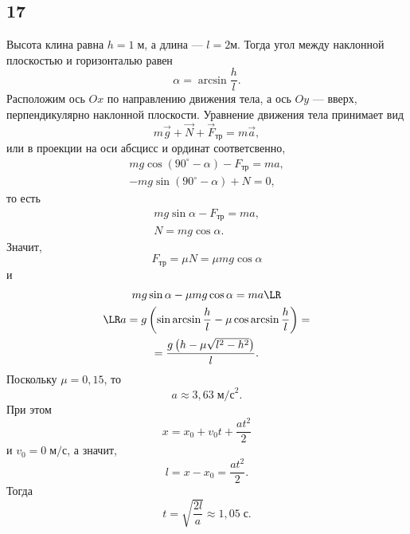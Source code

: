\subsection{17}

Высота клина равна $h=1\;\text{м}$, а длина --- $l=2\text{м}$. Тогда угол между наклонной плоскостью и горизонталью равен
\[
\alpha=\arcsin\frac{h}{l}.
\]
Расположим ось $Ox$ по направлению движения тела, а ось $Oy$ --- вверх, перпендикулярно наклонной плоскости. Уравнение движения тела принимает вид
\[
m\vec g+\vec N +\vec F_\text{тр}=m\vec a,
\]
или в проекции на оси абсцисс и ординат соответсвенно,
\begin{gather*}
mg\cos(90^\circ-\alpha)-F_\text{тр}=ma, \\
-mg\sin(90^\circ-\alpha)+N=0,
\end{gather*}
то есть
\begin{gather*}
mg\sin\alpha-F_\text{тр}=ma, \\
N=mg\cos\alpha.
\end{gather*}
Значит,
\[
F_\text{тр}=\mu N=\mu mg\cos\alpha
\]
и
\begin{multline*}
mg\sin\alpha-\mu mg\cos\alpha=ma\LR \\
\LR a=g\left(\sin\arcsin\frac{h}{l}-\mu\cos\arcsin\frac{h}{l}\right)= \\
=\frac{g\left(h-\mu\sqrt{l^2-h^2}\right)}{l}.
\end{multline*}
Поскольку $\mu=0{,}15$, то
\[
a\approx3{,}63\;\text{м/с}^2.
\]
При этом
\[
x=x_0+v_0t+\frac{at^2}{2}
\]
и $v_0=0\;\text{м/с}$, а значит,
\[
l=x-x_0=\frac{at^2}{2}.
\]
Тогда
\[
t=\sqrt{\frac{2l}{a}}\approx1{,}05\;\text{с}.
\]